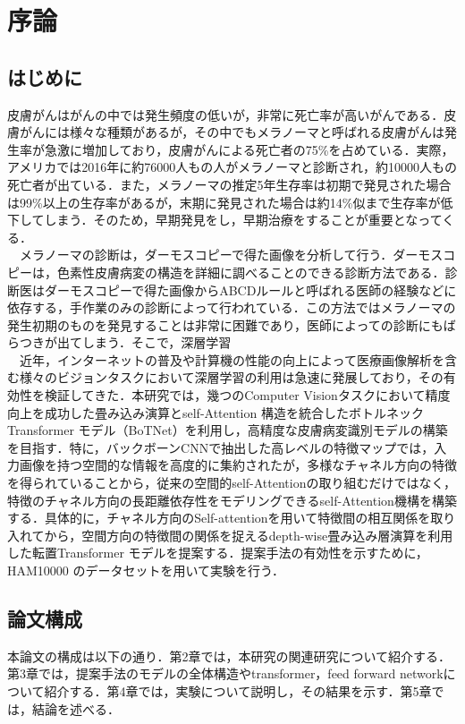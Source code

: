 \chapter{序論}
\label{chap:introduction}%

\section{はじめに}
皮膚がんはがんの中では発生頻度の低いが，非常に死亡率が高いがんである．皮膚がんには様々な種類があるが，その中でもメラノーマと呼ばれる皮膚がんは発生率が急激に増加しており，皮膚がんによる死亡者の75\%を占めている．実際，アメリカでは2016年に約76000人もの人がメラノーマと診断され，約10000人もの死亡者が出ている\cite{skin1}．また，メラノーマの推定5年生存率は初期で発見された場合は99\%以上の生存率があるが，末期に発見された場合は約14\%似まで生存率が低下してしまう．そのため，早期発見をし，早期治療をすることが重要となってくる\cite{skin2}．\\
　メラノーマの診断は，ダーモスコピーで得た画像を分析して行う．ダーモスコピーは，色素性皮膚病変の構造を詳細に調べることのできる診断方法である\cite{skin1}．診断医はダーモスコピーで得た画像からABCDルールと呼ばれる医師の経験などに依存する，手作業のみの診断によって行われている\cite{skin3}．この方法ではメラノーマの発生初期のものを発見することは非常に困難であり，医師によっての診断にもばらつきが出てしまう．そこで，深層学習\\
　近年，インターネットの普及や計算機の性能の向上によって医療画像解析を含む様々のビジョンタスクにおいて深層学習の利用は急速に発展しており，その有効性を検証してきた．本研究では，幾つのComputer Visionタスクにおいて精度向上を成功した畳み込み演算とself-Attention 構造を統合したボトルネックTransformer モデル（BoTNet）\cite{botnet}を利用し，高精度な皮膚病変識別モデルの構築を目指す．特に，バックボーンCNNで抽出した高レベルの特徴マップでは，入力画像を持つ空間的な情報を高度的に集約されたが，多様なチャネル方向の特徴を得られていることから，従来の空間的self-Attentionの取り組むだけではなく，特徴のチャネル方向の長距離依存性をモデリングできるself-Attention機構を構築する．具体的に，チャネル方向のSelf-attentionを用いて特徴間の相互関係を取り入れてから，空間方向の特徴間の関係を捉えるdepth-wise畳み込み層演算を利用した転置Transformer モデルを提案する．提案手法の有効性を示すために，HAM10000 のデータセットを用いて実験を行う．
\section{論文構成}
本論文の構成は以下の通り．第2章では，本研究の関連研究について紹介する．第3章では，提案手法のモデルの全体構造やtransformer，feed forward networkについて紹介する．第4章では，実験について説明し，その結果を示す．第5章では，結論を述べる．